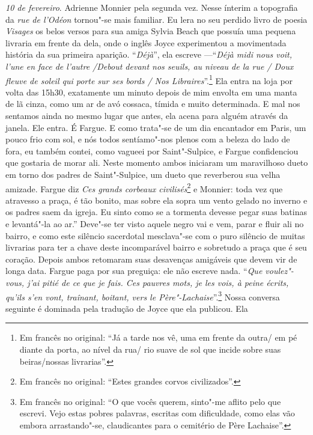 \emph{10 de fevereiro}. Adrienne Monnier pela segunda vez. Nesse ínterim
a topografia da \emph{rue de l'Odéon} tornou"-se mais familiar. Eu lera
no seu perdido livro de poesia \emph{Visages} os belos versos para sua
amiga Sylvia Beach que possuía uma pequena livraria em frente da dela,
onde o inglês Joyce experimentou a movimentada história da sua primeira
aparição. ``\emph{Déjà}'', ela escreve ---``\emph{Déjà midi nous voit,
l'une en face de l'autre /Debout devant nos seuils, au niveau de la rue
/ Doux fleuve de soleil qui porte sur ses bords / Nos
Libraires}''.\footnote{Em francês no original: ``Já a tarde nos vê, uma em frente da outra/
  em pé diante da porta, ao nível da rua/ rio suave de sol que incide
  sobre suas beiras/nossas livrarias''. \versal{[N. T.]}} Ela
entra na loja por volta das 15h30, exatamente um minuto depois de mim
envolta em uma manta de lã cinza, como um ar de avó cossaca, tímida e
muito determinada. E mal nos sentamos ainda no mesmo lugar que antes,
ela acena para alguém através da janela. Ele entra. É Fargue. E como
trata"-se de um dia encantador em Paris, um pouco frio com sol, e nós
todos sentíamo"-nos plenos com a beleza do lado de fora, eu também
contei, como vagueei por Saint"-Sulpice, e Fargue confidenciou que
gostaria de morar ali. Neste momento ambos iniciaram um maravilhoso
dueto em torno dos padres de Saint"-Sulpice, um dueto que reverberou sua
velha amizade. Fargue diz \emph{Ces grands corbeaux civilisés}\footnote{Em francês no original:
  ``Estes grandes corvos civilizados''. \versal{[N. T.]}} e
Monnier: toda vez que atravesso a praça, é tão bonito, mas sobre ela
sopra um vento gelado no inverno e os padres saem da igreja. Eu sinto
como se a tormenta devesse pegar suas batinas e levantá"-la ao ar.''
Deve"-se ter visto aquele negro vai e vem, parar e fluir ali no bairro, e
como este silêncio sacerdotal mesclava"-se com o puro silêncio de muitas
livrarias para ter a chave deste incomparável bairro e sobretudo a praça
que é seu coração. Depois ambos retomaram suas desavenças amigáveis que
devem vir de longa data. Fargue paga por sua preguiça: ele não escreve
nada. ``\emph{Que voulez"-vous, j'ai pitié de ce que je fais. Ces pauvres
mots, je les vois, à peine écrits, qu'ils s'en vont, traînant, boitant,
vers le Père"-Lachaise}''.\footnote{Em francês no original: ``O que vocês querem, sinto"-me
  aflito pelo que escrevi. Vejo estas pobres palavras, escritas com
  dificuldade, como elas vão embora arrastando"-se, claudicantes para o
  cemitério de Père Lachaise''. \versal{[N. T.]}} Nossa conversa
seguinte é dominada pela tradução de Joyce que ela publicou. Ela
